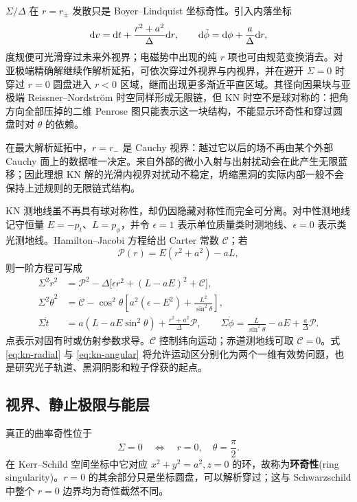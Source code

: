 $\Sigma/\Delta$ 在 $r=r_\pm$ 发散只是 Boyer--Lindquist 坐标奇性。引入内落坐标
\begin{equation}\label{eq:kn-ingoing}
    \dd v=\dd t+\frac{r^2+a^2}{\Delta}\dd r,
    \qquad
    \dd\tilde\phi=\dd\phi+\frac{a}{\Delta}\dd r,
\end{equation}
度规便可光滑穿过未来外视界；电磁势中出现的纯 $r$ 项也可由规范变换消去。对亚极端精确解继续作解析延拓，可依次穿过外视界与内视界，并在避开 $\Sigma=0$ 时穿过 $r=0$ 圆盘进入 $r<0$ 区域，继而出现更多渐近平直区域。其径向因果块与亚极端 Reissner--Nordstr\"om 时空同样形成无限链，但 KN 时空不是球对称的：把角方向全部压掉的二维 Penrose 图只能表示这一块结构，不能显示环奇性和穿过圆盘时对 $\theta$ 的依赖。

在最大解析延拓中，$r=r_-$ 是 Cauchy 视界：越过它以后的场不再由某个外部 Cauchy 面上的数据唯一决定。来自外部的微小入射与出射扰动会在此产生无限蓝移；因此理想 KN 解的光滑内视界对扰动不稳定，坍缩黑洞的实际内部一般不会保持上述规则的无限链式结构。

KN 测地线虽不再具有球对称性，却仍因隐藏对称性而完全可分离。对中性测地线记守恒量 $E=-p_t$、$L=p_\phi$，并令 $\epsilon=1$ 表示单位质量类时测地线、$\epsilon=0$ 表示类光测地线。Hamilton--Jacobi 方程给出 Carter 常数 $\mathcal C$；若
\[
    \mathcal P(r)=E(r^2+a^2)-aL,
\]
则一阶方程可写成
\begin{align}
    \Sigma^2\dot r^2&=\mathcal P^2
      -\Delta\bigl[\epsilon r^2+(L-aE)^2+\mathcal C\bigr],\label{eq:kn-radial}\\
    \Sigma^2\dot\theta^2&=\mathcal C-\cos^2\theta
      \left[a^2(\epsilon-E^2)+\frac{L^2}{\sin^2\theta}\right],\label{eq:kn-angular}\\
    \Sigma\dot t&=a(L-aE\sin^2\theta)
      +\frac{r^2+a^2}{\Delta}\mathcal P,\qquad
    \Sigma\dot\phi=\frac{L}{\sin^2\theta}-aE
      +\frac{a}{\Delta}\mathcal P .\label{eq:kn-tphi}
\end{align}
点表示对固有时或仿射参数求导。$\mathcal C$ 控制纬向运动；赤道测地线可取 $\mathcal C=0$。式 \eqref{eq:kn-radial} 与 \eqref{eq:kn-angular} 将允许运动区分别化为两个一维有效势问题，也是研究光子轨道、黑洞阴影和粒子俘获的起点。

\subsection{视界、静止极限与能层}

真正的曲率奇性位于
\[
    \Sigma=0\quad\Longleftrightarrow\quad r=0,
    \quad\theta=\frac{\pi}{2}.
\]
在 Kerr--Schild 空间坐标中它对应 $x^2+y^2=a^2,z=0$ 的环，故称为\textbf{环奇性}(ring singularity)。$r=0$ 的其余部分只是坐标圆盘，可以解析穿过；这与 Schwarzschild 中整个 $r=0$ 边界均为奇性截然不同。

